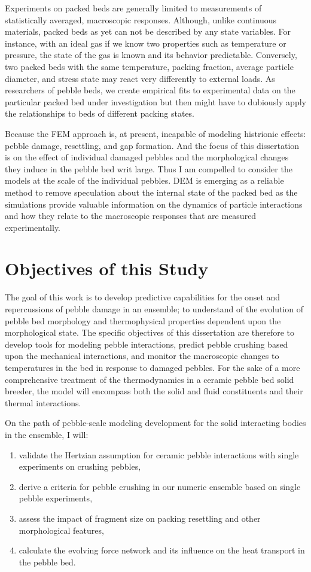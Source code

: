 Experiments on packed beds are generally limited to measurements of statistically averaged, macroscopic responses. Although, unlike continuous materials, packed beds as yet can not be described by any state variables. For instance, with an ideal gas if we know two properties such as temperature or pressure, the state of the gas is known and its behavior predictable. Conversely, two packed beds with the same temperature, packing fraction, average particle diameter, and stress state may react very differently to external loads. As researchers of pebble beds, we create empirical fits to experimental data on the particular packed bed under investigation but then might have to dubiously apply the relationships to beds of different packing states. 

Because the FEM approach is, at present, incapable of modeling histrionic effects: pebble damage, resettling, and gap formation. And the focus of this dissertation is on the effect of individual damaged pebbles and the morphological changes they induce in the pebble bed writ large. Thus I am compelled to consider the models at the scale of the individual pebbles. DEM is emerging as a reliable method to remove speculation about the internal state of the packed bed as the simulations provide valuable information on the dynamics of particle interactions and how they relate to the macroscopic responses that are measured experimentally.




\section{Objectives of this Study}\label{sec:intro-scope-of-work}
The goal of this work is to develop predictive capabilities for the onset and repercussions of pebble damage in an ensemble; to understand of the evolution of pebble bed morphology and thermophysical properties dependent upon the morphological state. The specific objectives of this dissertation are therefore to develop tools for modeling pebble interactions, predict pebble crushing based upon the mechanical interactions, and monitor the macroscopic changes to temperatures in the bed in response to damaged pebbles. For the sake of a more comprehensive treatment of the thermodynamics in a ceramic pebble bed solid breeder, the model will encompass both the solid and fluid constituents and their thermal interactions.

On the path of pebble-scale modeling development for the solid interacting bodies in the ensemble, I will:
\begin{enumerate}
	\item validate the Hertzian assumption for ceramic pebble interactions with single experiments on crushing pebbles,
	\item derive a criteria for pebble crushing in our numeric ensemble based on single pebble experiments,
	\item assess the impact of fragment size on packing resettling and other morphological features,
	\item calculate the evolving force network and its influence on the heat transport in the pebble bed.
\end{enumerate}

